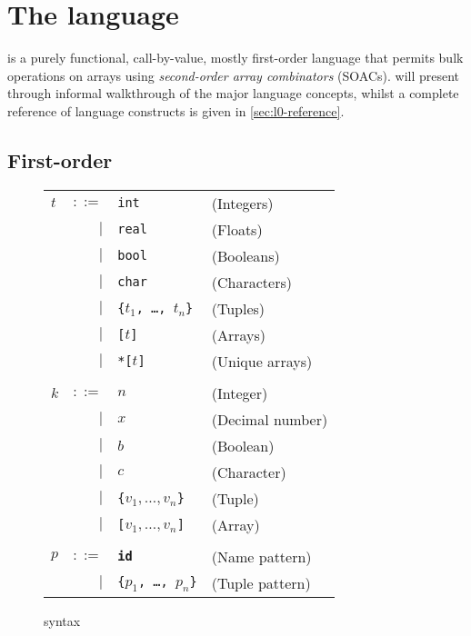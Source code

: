 \chapter{The \LO{} language}
\label{chap:l0language}

\LO{} is a purely functional, call-by-value, mostly first-order
language that permits bulk operations on arrays using
\textit{second-order array combinators} (SOACs).
 will present \LO{} through informal
walkthrough of the major language concepts, whilst a complete
reference of language constructs is given in \cref{sec:l0-reference}.

\section{First-order \LO{}}
\label{sec:fo-l0}

\begin{figure}[bt]
\begin{tabular}{lrll}
$t$ & $::=$ & \texttt{int} & (Integers) \\
& $|$ & \texttt{real} & (Floats) \\
& $|$ & \texttt{bool} & (Booleans) \\
& $|$ & \texttt{char} & (Characters) \\
& $|$ & \texttt{\{$t_{1}$, \ldots, $t_{n}$\}} & (Tuples) \\
& $|$ & \texttt{[$t$]} & (Arrays) \\
& $|$ & \texttt{*[$t$]} & (Unique arrays) \\
\\
$k$ & $::=$ & $n$ & (Integer)\\
& $|$ & $x$ & (Decimal number) \\
& $|$ & $b$ & (Boolean)\\
& $|$ & $c$ & (Character)\\
& $|$ & \texttt{\{$v_{1},\ldots,v_{n}$\}} & (Tuple) \\
& $|$ & \texttt{[$v_{1},\ldots,v_{n}$]} & (Array) \\
\\
$p$ & $::=$ & \texttt{\textbf{id}} & (Name pattern)\\
& $|$ & \texttt{\{$p_{1}$, \ldots, $p_{n}$\}} & (Tuple pattern) \\
\end{tabular}
\caption{\LO{} syntax}
\label{fig:fo-syntax}
\end{figure}

